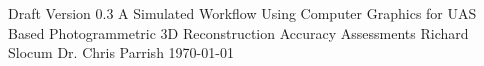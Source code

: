 \documentclass{article}
\begin{document}
\insertOSUTitleTwo
{Draft}
{Version 0.3}
{A Simulated Workflow Using Computer Graphics for UAS Based Photogrammetric 3D Reconstruction Accuracy Assessments}
{Richard}
{Slocum}
{Dr. Chris}
{Parrish}
{\today}
	

\cleardoublepage











\cleardoublepage

	
\end{document}

